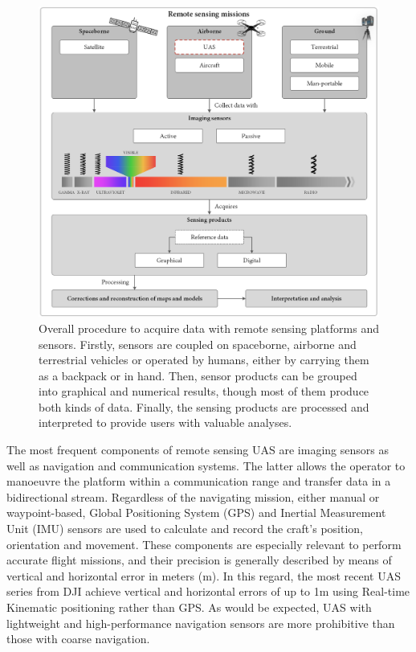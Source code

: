 \begin{figure}[!ht]
	\includegraphics{figs/introduction/introduction_scheme.png}
	\caption{Overall procedure to acquire data with remote sensing platforms and sensors. Firstly, sensors are coupled on spaceborne, airborne and terrestrial vehicles or operated by humans, either by carrying them as a backpack or in hand. Then, sensor products can be grouped into graphical and numerical results, though most of them produce both kinds of data. Finally, the sensing products are processed and interpreted to provide users with valuable analyses. }
    \label{fig:introduction_scheme}
\end{figure}

The most frequent components of remote sensing UAS are imaging sensors as well as navigation and communication systems. The latter allows the operator to manoeuvre the platform within a communication range and transfer data in a bidirectional stream. Regardless of the navigating mission, either manual or waypoint-based, Global Positioning System (GPS) and Inertial Measurement Unit (IMU) sensors are used to calculate and record the craft's position, orientation and movement. These components are especially relevant to perform accurate flight missions, and their precision is generally described by means of vertical and horizontal error in meters (\si{\meter}). In this regard, the most recent UAS series from DJI achieve vertical and horizontal errors of up to 1\si{\meter} using Real-time Kinematic positioning rather than GPS. As would be expected, UAS with lightweight and high-performance navigation sensors are more prohibitive than those with coarse navigation.    

